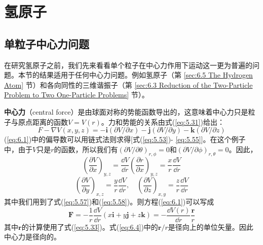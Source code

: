 \chapter{氢原子}
\label{chap:6}
    
\section{单粒子中心力问题}
\label{sec:6.1 The One-Particle Central Force Problem}
    在研究氢原子之前，我们先来看看单个粒子在中心力作用下运动这一更为普遍的问题。本节的结果适用于任何中心力问题。例如氢原子（第 \ref{sec:6.5 The Hydrogen Atom} 节）和各向同性的三维谐振子（第 \ref{sec:6.3 Reduction of the Two-Particle Problem to Two One-Particle Problems} 节）。

    \textbf{中心力}（central force）是由球面对称的势能函数导出的，这意味着中心力只是粒子与原点距离的函数$V = V\left(r\right)$。力和势能的关系由式(\ref{eq:5.31})给出：
    \begin{equation}
        F - \nabla V\left(x,y,z\right) = -\mathbf{i}\left(\partial V/\partial x\right) - \mathbf{j}\left(\partial V/\partial y\right) - \mathbf{k}\left(\partial V/\partial z\right)
        \label{eq:6.1}
    \end{equation}
    (\ref{eq:6.1})中的偏导数可以用链式法则求得[式(\ref{eq:5.53})- \ref{eq:5.55}]。在这个例子中，由于$V$只是$r$的函数，所以我们有$\left(\partial V/\partial\theta\right)_{r,\phi} = 0$和$\left(\partial V/\partial\phi\right)_{r,\theta} = 0$。因此，
    \begin{equation}
        \left(\frac{\partial V}{\partial x}\right)_{y,z} = \frac{\dd V}{\dd r}\left(\frac{\partial r}{\partial x}\right)_{y,z} = \frac{x}{r}\frac{\dd V}{\dd r}
        \label{eq:6.2}
    \end{equation}
    \begin{equation}
        \left(\frac{\partial V}{\partial y}\right)_{x,z} = \frac{y}{r}\frac{\dd V}{\dd r}, \quad \left(\frac{\partial V}{\partial z}\right)_{x,y} = \frac{z}{r}\frac{\dd V}{\dd r}
        \label{eq:6.3}
    \end{equation}
    其中我们用到了式(\ref{eq:5.57})和(\ref{eq:5.58})。则方程(\ref{eq:6.1})可以写成
    \begin{equation}
        \mathbf{F} = -\frac{1}{r}\frac{\dd V}{\dd r}\left(x\mathbf{i}+y\mathbf{j}+z\mathbf{k}\right) = -\frac{\dd V\left(r\right)}{\dd r}\frac{\mathbf{r}}{r}
        \label{eq:6.4}
    \end{equation}
    其中$\mathbf{r}$的计算使用了式(\ref{eq:5.33})。式(\ref{eq:6.4})中的$\mathbf{r}/r$是径向上的单位矢量。因此中心力是径向的。

